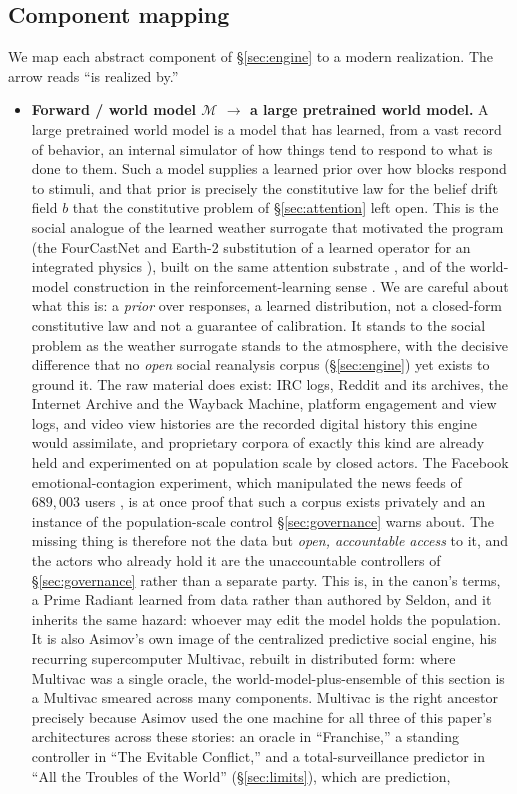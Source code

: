 \documentclass[11pt]{article}
\begin{document}
\subsection{Component mapping}

We map each abstract component of \S\ref{sec:engine} to a modern realization. The arrow reads ``is realized by.''
\begin{itemize}[itemsep=3pt,leftmargin=1.4em]
\item \textbf{Forward / world model $\mathcal{M}$ $\rightarrow$ a large pretrained world model.} A large pretrained world model is a model that has learned, from a vast record of behavior, an internal simulator of how things tend to respond to what is done to them. Such a model supplies a learned prior over how blocks respond to stimuli, and that prior is precisely the constitutive law for the belief drift field $b$ that the constitutive problem of \S\ref{sec:attention} left open. This is the social analogue of the learned weather surrogate that motivated the program (the FourCastNet and Earth-2 substitution of a learned operator for an integrated physics \cite{pathak2022}), built on the same attention substrate \cite{vaswani2017}, and of the world-model construction in the reinforcement-learning sense \cite{ha2018}. We are careful about what this is: a \emph{prior} over responses, a learned distribution, not a closed-form constitutive law and not a guarantee of calibration. It stands to the social problem as the weather surrogate stands to the atmosphere, with the decisive difference that no \emph{open} social reanalysis corpus (\S\ref{sec:engine}) yet exists to ground it. The raw material does exist: IRC logs, Reddit and its archives, the Internet Archive and the Wayback Machine, platform engagement and view logs, and video view histories are the recorded digital history this engine would assimilate, and proprietary corpora of exactly this kind are already held and experimented on at population scale by closed actors. The Facebook emotional-contagion experiment, which manipulated the news feeds of $689{,}003$ users \cite{kramer2014}, is at once proof that such a corpus exists privately and an instance of the population-scale control \S\ref{sec:governance} warns about. The missing thing is therefore not the data but \emph{open, accountable access} to it, and the actors who already hold it are the unaccountable controllers of \S\ref{sec:governance} rather than a separate party. This is, in the canon's terms, a Prime Radiant learned from data rather than authored by Seldon, and it inherits the same hazard: whoever may edit the model holds the population. It is also Asimov's own image of the centralized predictive social engine, his recurring supercomputer Multivac, rebuilt in distributed form: where Multivac was a single oracle, the world-model-plus-ensemble of this section is a Multivac smeared across many components. Multivac is the right ancestor precisely because Asimov used the one machine for all three of this paper's architectures across these stories: an oracle in ``Franchise,'' a standing controller in ``The Evitable Conflict,'' and a total-surveillance predictor in ``All the Troubles of the World'' (\S\ref{sec:limits}), which are prediction, 
\end{itemize}
\end{document}
